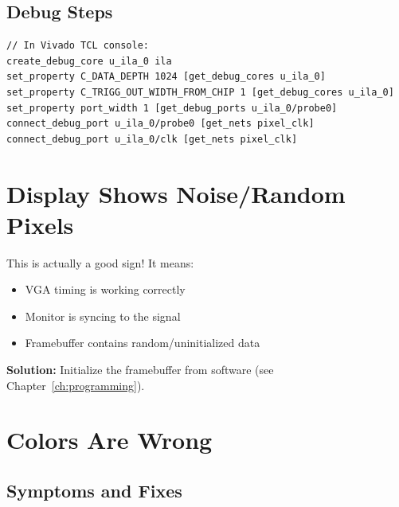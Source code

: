 \documentclass[11pt,letterpaper]{report}
\begin{document}
\subsection{Debug Steps}

\begin{lstlisting}[style=c,caption={Insert ILA for Clock Debugging}]
// In Vivado TCL console:
create_debug_core u_ila_0 ila
set_property C_DATA_DEPTH 1024 [get_debug_cores u_ila_0]
set_property C_TRIGG_OUT_WIDTH_FROM_CHIP 1 [get_debug_cores u_ila_0]
set_property port_width 1 [get_debug_ports u_ila_0/probe0]
connect_debug_port u_ila_0/probe0 [get_nets pixel_clk]
connect_debug_port u_ila_0/clk [get_nets pixel_clk]
\end{lstlisting}

\section{Display Shows Noise/Random Pixels}

This is actually a good sign! It means:
\begin{itemize}
    \item VGA timing is working correctly
    \item Monitor is syncing to the signal
    \item Framebuffer contains random/uninitialized data
\end{itemize}

\textbf{Solution:} Initialize the framebuffer from software (see Chapter~\ref{ch:programming}).

\section{Colors Are Wrong}

\subsection{Symptoms and Fixes}
\end{document}
